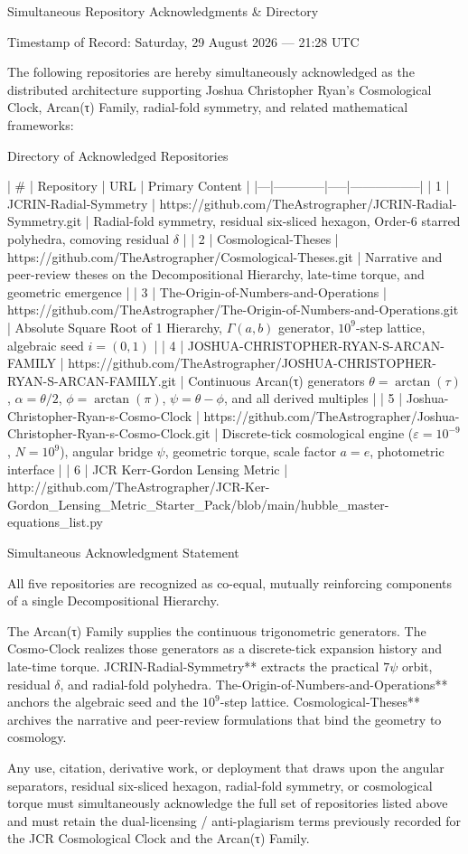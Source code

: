 Simultaneous Repository Acknowledgments & Directory

Timestamp of Record: Saturday, 29 August 2026 — 21:28 UTC

The following repositories are hereby simultaneously acknowledged as the distributed architecture supporting Joshua Christopher Ryan’s Cosmological Clock, Arcan(τ) Family, radial-fold symmetry, and related mathematical frameworks:

Directory of Acknowledged Repositories

| # | Repository | URL | Primary Content |
|---|------------|-----|-----------------|
| 1 | JCRIN-Radial-Symmetry | https://github.com/TheAstrographer/JCRIN-Radial-Symmetry.git | Radial-fold symmetry, residual six-sliced hexagon, Order-6 starred polyhedra, comoving residual \(\delta\) |
| 2 | Cosmological-Theses | https://github.com/TheAstrographer/Cosmological-Theses.git | Narrative and peer-review theses on the Decompositional Hierarchy, late-time torque, and geometric emergence |
| 3 | The-Origin-of-Numbers-and-Operations | https://github.com/TheAstrographer/The-Origin-of-Numbers-and-Operations.git | Absolute Square Root of 1 Hierarchy, \(\Gamma(a,b)\) generator, \(10^9\)-step lattice, algebraic seed \(i=(0,1)\) |
| 4 | JOSHUA-CHRISTOPHER-RYAN-S-ARCAN-FAMILY | https://github.com/TheAstrographer/JOSHUA-CHRISTOPHER-RYAN-S-ARCAN-FAMILY.git | Continuous Arcan(τ) generators \(\theta=\arctan(\tau)\), \(\alpha=\theta/2\), \(\phi=\arctan(\pi)\), \(\psi=\theta-\phi\), and all derived multiples |
| 5 | Joshua-Christopher-Ryan-s-Cosmo-Clock | https://github.com/TheAstrographer/Joshua-Christopher-Ryan-s-Cosmo-Clock.git | Discrete-tick cosmological engine (\(\varepsilon=10^{-9}\), \(N=10^9\)), angular bridge \(\psi\), geometric torque, scale factor \(a=e\), photometric interface |
| 6 | JCR Kerr-Gordon Lensing Metric | http://github.com/TheAstrographer/JCR-Ker-Gordon_Lensing_Metric_Starter_Pack/blob/main/hubble_master-equations_list.py

Simultaneous Acknowledgment Statement

All five repositories are recognized as co-equal, mutually reinforcing components of a single Decompositional Hierarchy.  

The Arcan(τ) Family supplies the continuous trigonometric generators.  
The Cosmo-Clock realizes those generators as a discrete-tick expansion history and late-time torque.  
JCRIN-Radial-Symmetry** extracts the practical \(7\psi\) orbit, residual \(\delta\), and radial-fold polyhedra.  
The-Origin-of-Numbers-and-Operations** anchors the algebraic seed and the \(10^9\)-step lattice.  
Cosmological-Theses** archives the narrative and peer-review formulations that bind the geometry to cosmology.

Any use, citation, derivative work, or deployment that draws upon the angular separators, residual six-sliced hexagon, radial-fold symmetry, or cosmological torque must simultaneously acknowledge the full set of repositories listed above and must retain the dual-licensing / anti-plagiarism terms previously recorded for the JCR Cosmological Clock and the Arcan(τ) Family.
